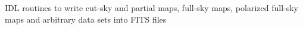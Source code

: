   \item[%
\htmlref{write\_fits\_cut4}{idl:write_fits_cut4},
\htmlref{write\_fits\_partial}{idl:write_fits_partial},
\htmlref{write\_fits\_map}{idl:write_fits_map}]
  \item[%
\htmlref{write\_tqu}{idl:write_tqu},
\htmlref{write\_fits\_sb}{idl:write_fits_sb}]
\healpix IDL routines to write cut-sky and partial maps, full-sky maps, polarized full-sky maps and
arbitrary data sets into FITS files
